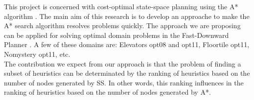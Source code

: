 \documentclass[11pt,a4paper,oneside]{report}
\begin{document}
This project is concerned with cost-optimal state-space planning using the A* algorithm \citep{hart1968formal}. The main aim of this research is to develop an approache to make the A* search algorithm resolves problems quickly. The approach we are proposing can be applied for solving optimal domain problems in the Fast-Downward Planner \citep{helmert2006fast}. A few of these domains are: Elevators opt08 and opt11, Floortile opt11, Nomystery opt11, etc.
\\

The contribution we expect from our approach is that the problem of finding a subset of heuristics can be determinated by the ranking of heuristics based on the number of nodes generated by SS. In other words, this ranking influences in the ranking of heuristics based on the number of nodes generated by A*.
\newpage


%
\end{document}

